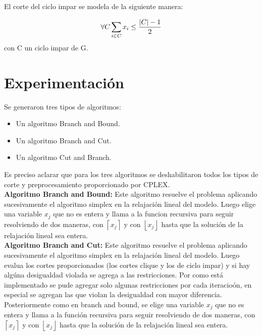 {{El corte del ciclo impar se modela de la siguiente manera:

\begin{equation*}
    \forall C \sum_{i \in C} x_i \leq \frac{\left\vert{C}\right\vert -1}{2}  \\
\end{equation*}
con C un ciclo impar de G.


}

\newpage
\section{Experimentación}

Se generaron tres tipos de algoritmos:
\begin{itemize}
\item Un algoritmo Branch and Bound.
\item Un algoritmo Branch and Cut.
\item Un algoritmo Cut and Branch.
\end{itemize} 

Es preciso aclarar que para los tres algoritmos se deshabilitaron todos los tipos de corte y preprocesamiento
proporcionado por CPLEX.\\

\textbf{Algoritmo Branch and Bound:} Este algoritmo resuelve el problema aplicando sucesivamente
el algoritmo simplex en la relajaci\'on lineal del modelo. Luego elige una variable $x_j$ que no es entera y 
llama a la funcion recursiva para seguir resolviendo de dos maneras, con $\left \lceil{x_j}\right \rceil$ y 
con 
$\left \lfloor{x_j}\right \rfloor$ hasta que la soluci\'on de la relajaci\'on lineal sea entera.\\


\textbf{Algoritmo Branch and Cut:} Este algoritmo resuelve el problema aplicando sucesivamente
el algoritmo simplex en la relajaci\'on lineal del modelo. Luego evalua los cortes proporcionados
(los cortes clique y los de ciclo impar) y si hay alg\'una desigualdad violada se agrega a las restricciones.
Por como est\'a implementado se pude agregar solo algunas restricciones por cada iteracio\'on, en especial 
se agregan las que violan la desigualdad con mayor diferencia.
Posteriormente como en branch and bound, se elige una variable $x_j$ que no es entera y llama 
a la funci\'on recursiva para seguir resolviendo de dos maneras, con $\left \lceil{x_j}\right \rceil$ y con 
$\left \lfloor{x_j}\right \rfloor$ hasta que la soluci\'on de la relajaci\'on lineal sea entera.\\

}
